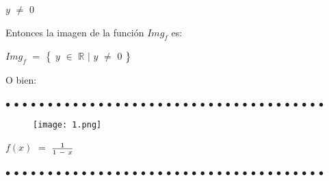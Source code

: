 \documentclass[12pt]{article}
\newenvironment{MyColorPar}[1]{%
    \leavevmode\color{#1}\ignorespaces%
}{%
}%
\begin{document}
\begin{MyColorPar}{Lochinvar}
\hspace{4cm} $y$ $\neq$ $0$ \vspace{0.5cm}

Entonces la imagen de la función $Img_{f}$ es: \vspace{0.5cm}

\hspace{2cm} $Img_{f}$ $=$ $\big{\{}$ $y$ $\in$ $\mathbb{R}$ $\mid$  $y$ $\neq$ $0$ $\big{\}}$ \vspace{0.5cm}

O bien: \vspace{0.5cm}

\hspace{3cm}  \vspace{0.5cm}

\end{MyColorPar}

\begin{MyColorPar}{Saffron} \bfseries{
 $\bullet$ $\bullet$ $\bullet$ $\bullet$ $\bullet$ $\bullet$ $\bullet$ $\bullet$ $\bullet$ $\bullet$ $\bullet$ $\bullet$ $\bullet$ $\bullet$ $\bullet$ $\bullet$ $\bullet$ $\bullet$ $\bullet$ $\bullet$ $\bullet$ $\bullet$ $\bullet$ $\bullet$ $\bullet$ $\bullet$ $\bullet$ $\bullet$ $\bullet$ $\bullet$ $\bullet$ $\bullet$ $\bullet$ $\bullet$ $\bullet$ $\bullet$ $\bullet$ $\bullet$  }
\end{MyColorPar} \vspace{0.5cm}

\begin{MyColorPar}{Lochinvar} \bfseries{
{}}  \vspace{0.5cm}
\end{MyColorPar}

\begin{figure}[htb] \centering

    \texttt{[image: 1.png]} 

\end{figure}

 $f(x)$ $=$ {\LARGE{$\frac{1}{1 \hspace{0.1cm} - \hspace{0.1cm} x }$}}\vspace{0.5cm}
 
 \begin{MyColorPar}{Saffron} \bfseries{
 $\bullet$ $\bullet$ $\bullet$ $\bullet$ $\bullet$ $\bullet$ $\bullet$ $\bullet$ $\bullet$ $\bullet$ $\bullet$ $\bullet$ $\bullet$ $\bullet$ $\bullet$ $\bullet$ $\bullet$ $\bullet$ $\bullet$ $\bullet$ $\bullet$ $\bullet$ $\bullet$ $\bullet$ $\bullet$ $\bullet$ $\bullet$ $\bullet$ $\bullet$ $\bullet$ $\bullet$ $\bullet$ $\bullet$ $\bullet$ $\bullet$ $\bullet$ $\bullet$ $\bullet$  }
\end{MyColorPar} \vspace{0.5cm}
\end{document}
